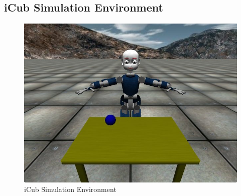 \documentclass[a4paper, 11pt]{report}
\begin{document}
\subsection{iCub Simulation Environment}
\begin{figure}[h!]
  \centering
  \includegraphics[width=1.0\linewidth]{sim}
  \caption{iCub Simulation Environment}
  \label{fig:icub}
  \end{figure}
\end{document}
